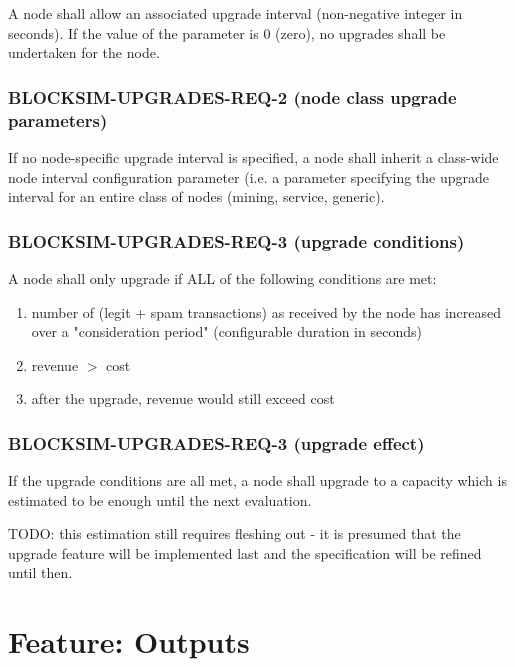 \documentclass{scrreprt}
\begin{document}
        A node shall allow an associated upgrade interval (non-negative integer
        in seconds).
        If the value of the parameter is 0 (zero), no upgrades shall be
        undertaken for the node.

      \subsubsection{BLOCKSIM-UPGRADES-REQ-2 (node class upgrade parameters)}

        If no node-specific upgrade interval is specified, a node shall inherit
        a class-wide node interval configuration parameter (i.e. a parameter
        specifying the upgrade interval for an entire class of nodes (mining,
        service, generic).

      \subsubsection{BLOCKSIM-UPGRADES-REQ-3 (upgrade conditions)}

        A node shall only upgrade if ALL of the following conditions are met:

        \begin{enumerate}
          \item number of (legit + spam transactions) as received by the node
            has increased over a "consideration period"
            (configurable duration in seconds)

          \item revenue $>$ cost

          \item after the upgrade, revenue would still exceed cost
        \end{enumerate}

      \subsubsection{BLOCKSIM-UPGRADES-REQ-3 (upgrade effect)}

        If the upgrade conditions are all met, a node shall upgrade to a
        capacity which is estimated to be enough until the next evaluation.

        TODO: this estimation still requires fleshing out - it is presumed that
        the upgrade feature will be implemented last and the specification will
        be refined until then.

  \section{Feature: Outputs}
\end{document}
